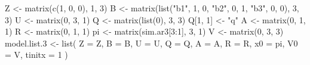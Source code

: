 \begin{Schunk}
\begin{Sinput}
 Z <- matrix(c(1, 0, 0), 1, 3)
 B <- matrix(list("b1", 1, 0, "b2", 0, 1, "b3", 0, 0), 3, 3)
 U <- matrix(0, 3, 1)
 Q <- matrix(list(0), 3, 3)
 Q[1, 1] <- "q"
 A <- matrix(0, 1, 1)
 R <- matrix(0, 1, 1)
 pi <- matrix(sim.ar3[3:1], 3, 1)
 V <- matrix(0, 3, 3)
 model.list.3 <- list(
   Z = Z, B = B, U = U, Q = Q, A = A,
   R = R, x0 = pi, V0 = V, tinitx = 1
 )
\end{Sinput}
\end{Schunk}
